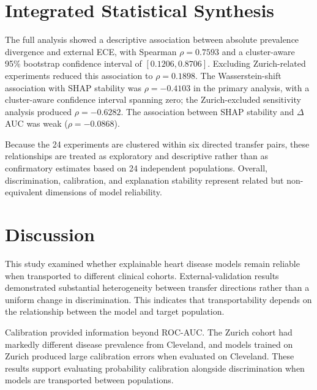 \documentclass[10pt,journal,twocolumn]{IEEEtran}
\begin{document}
\FloatBarrier


\section{Integrated Statistical Synthesis}

The full analysis showed a descriptive association between absolute prevalence divergence and external ECE, with Spearman $\rho=0.7593$ and a cluster-aware 95\% bootstrap confidence interval of $[0.1206,0.8706]$. Excluding Zurich-related experiments reduced this association to $\rho=0.1898$. The Wasserstein-shift association with SHAP stability was $\rho=-0.4103$ in the primary analysis, with a cluster-aware confidence interval spanning zero; the Zurich-excluded sensitivity analysis produced $\rho=-0.6282$. The association between SHAP stability and $\Delta$AUC was weak ($\rho=-0.0868$).

Because the 24 experiments are clustered within six directed transfer pairs, these relationships are treated as exploratory and descriptive rather than as confirmatory estimates based on 24 independent populations. Overall, discrimination, calibration, and explanation stability represent related but non-equivalent dimensions of model reliability.


\section{Discussion}

This study examined whether explainable heart disease models remain reliable when transported to different clinical cohorts. External-validation results demonstrated substantial heterogeneity between transfer directions rather than a uniform change in discrimination. This indicates that transportability depends on the relationship between the model and target population.

Calibration provided information beyond ROC-AUC. The Zurich cohort had markedly different disease prevalence from Cleveland, and models trained on Zurich produced large calibration errors when evaluated on Cleveland. These results support evaluating probability calibration alongside discrimination when models are transported between populations.
\end{document}
